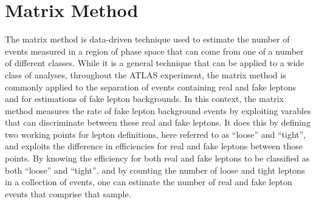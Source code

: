 
\section{Matrix Method}
\label{app:matrixmethod}

The matrix method is data-driven technique used to estimate the number of events measured in a region of phase space that can come from one of a number of different classes.
While it is a general technique that can be applied to a wide class of analyses, throughout the ATLAS experiment,
the matrix method is commonly applied to the separation of events containing real and fake leptons
and for estimations of fake lepton backgrounds. %
In this context, the matrix method measures the rate of fake lepton background events by exploiting varables that can discriminate
between these real and fake leptons.
It does this by defining two working points for lepton definitions, here referred to as ``loose'' and ``tight'',
and exploits the difference in efficiencies for real and fake leptons between those points.
By knowing the efficiency for both real and fake leptons to be classified as both ``loose'' and ``tight'',
and by counting the number of loose and tight leptons in a collection of events,
one can estimate the number of real and fake lepton events that comprise that sample.




